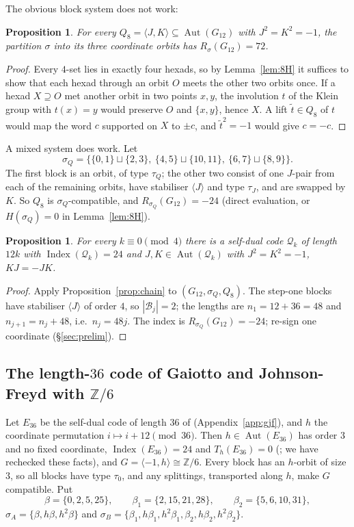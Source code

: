 \documentclass[11pt]{amsart}
\newtheorem{proposition}[theorem]{Proposition}
\theoremstyle{definition}
\newcommand{\Z}{\mathbb{Z}}
\newcommand{\Index}{\operatorname{Index}}
\newcommand{\Aut}{\operatorname{Aut}}
\newcommand{\cB}{\mathcal{B}}
\begin{document}
The obvious block system does not work:

\begin{proposition}\label{prop:orbits72}
For every $Q_8=\langle J,K\rangle\subseteq\Aut(G_{12})$ with $J^2=K^2=-1$, the partition $\sigma$
into its three coordinate orbits has $R_\sigma(G_{12})=72$.
\end{proposition}

\begin{proof}
Every $4$-set lies in exactly four hexads, so by Lemma~\ref{lem:8H} it suffices to show that each
hexad through an orbit $O$ meets the other two orbits once. If a hexad $X\supseteq O$ met another
orbit in two points $x,y$, the involution $t$ of the Klein group with $t(x)=y$ would preserve $O$ and
$\{x,y\}$, hence $X$. A lift $\tilde t\in Q_8$ of $t$ would map the word $c$ supported on $X$ to $\pm c$,
and $\tilde t^2=-1$ would give $c=-c$.
\end{proof}

A mixed system does work. Let
\[
  \sigma_Q=\bigl\{\{0,1\}\sqcup\{2,3\},\ \{4,5\}\sqcup\{10,11\},\ \{6,7\}\sqcup\{8,9\}\bigr\}.
\]
The first block is an orbit, of type $\tau_Q$; the other two consist of one $J$-pair from each of the
remaining orbits, have stabiliser $\langle J\rangle$ and type $\tau_J$, and are swapped by $K$. So
$Q_8$ is $\sigma_Q$-compatible, and $R_{\sigma_Q}(G_{12})=-24$ (direct evaluation, or
$H(\sigma_Q)=0$ in Lemma~\ref{lem:8H}).

\begin{proposition}\label{prop:Qfamily}
For every $k\equiv0\pmod4$ there is a self-dual code $\mathcal Q_k$ of length $12k$ with
$\Index(\mathcal Q_k)=24$ and $J,K\in\Aut(\mathcal Q_k)$ with $J^2=K^2=-1$, $KJ=-JK$.
\end{proposition}

\begin{proof}
Apply Proposition~\ref{prop:chain} to $(G_{12},\sigma_Q,Q_8)$. The step-one blocks have stabiliser
$\langle J\rangle$ of order $4$, so $|\cB_j|=2$; the lengths are $n_1=12+36=48$ and $n_{j+1}=n_j+48$,
i.e.\ $n_j=48j$. The index is $R_{\sigma_Q}(G_{12})=-24$; re-sign one coordinate
(\S\ref{sec:prelim}).
\end{proof}

\subsection{The length-\texorpdfstring{$36$}{36} code of Gaiotto and Johnson-Freyd with \texorpdfstring{$\Z/6$}{Z/6}}
Let $E_{36}$ be the self-dual code of length $36$ of \cite[Ex.~5.7(3)]{GJF} (Appendix~\ref{app:gjf}),
and $h$ the coordinate permutation $i\mapsto i+12\pmod{36}$. Then $h\in\Aut(E_{36})$ has order $3$ and
no fixed coordinate, $\Index(E_{36})=24$ and $T_h(E_{36})=0$ (\cite{GJF}; we have rechecked these
facts), and $G=\langle-1,h\rangle\cong\Z/6$. Every block has an $h$-orbit of size $3$, so all blocks have type $\tau_0$, and any
splittings, transported along $h$, make $G$ compatible. Put
\[
  \beta=\{0,2,5,25\},\qquad\beta_1=\{2,15,21,28\},\qquad\beta_2=\{5,6,10,31\},
\]
$\sigma_A=\{\beta,h\beta,h^2\beta\}$ and $\sigma_B=\{\beta_1,h\beta_1,h^2\beta_1,\beta_2,h\beta_2,
h^2\beta_2\}$.
\end{document}
